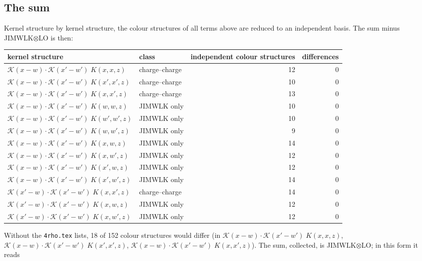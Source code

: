 \documentclass[10pt]{article}
\numberwithin{equation}{section}
\begin{document}
\subsection{The sum}
Kernel structure by kernel structure, the colour structures of all terms above are reduced to an independent basis. The sum minus JIMWLK$\otimes$LO is then:
\begin{table}[H]\centering\small
\begin{tabular}{@{}llrr@{}}\toprule
kernel structure & class & independent colour structures & differences\\\midrule
$\mathcal K(x-w)\cdot\mathcal K(x'-w')\;K(x,x,z)$ & {\color{CC}charge--charge} & 12 & 0\\
$\mathcal K(x-w)\cdot\mathcal K(x'-w')\;K(x',x',z)$ & {\color{CC}charge--charge} & 10 & 0\\
$\mathcal K(x-w)\cdot\mathcal K(x'-w')\;K(x,x',z)$ & {\color{CC}charge--charge} & 13 & 0\\
$\mathcal K(x-w)\cdot\mathcal K(x'-w')\;K(w,w,z)$ & {\color{JIM}JIMWLK only} & 10 & 0\\
$\mathcal K(x-w)\cdot\mathcal K(x'-w')\;K(w',w',z)$ & {\color{JIM}JIMWLK only} & 10 & 0\\
$\mathcal K(x-w)\cdot\mathcal K(x'-w')\;K(w,w',z)$ & {\color{JIM}JIMWLK only} & 9 & 0\\
$\mathcal K(x-w)\cdot\mathcal K(x'-w')\;K(x,w,z)$ & {\color{JIM}JIMWLK only} & 14 & 0\\
$\mathcal K(x-w)\cdot\mathcal K(x'-w')\;K(x,w',z)$ & {\color{JIM}JIMWLK only} & 12 & 0\\
$\mathcal K(x-w)\cdot\mathcal K(x'-w')\;K(x',w,z)$ & {\color{JIM}JIMWLK only} & 12 & 0\\
$\mathcal K(x-w)\cdot\mathcal K(x'-w')\;K(x',w',z)$ & {\color{JIM}JIMWLK only} & 14 & 0\\
$\mathcal K(x'-w)\cdot\mathcal K(x'-w')\;K(x,x',z)$ & {\color{CC}charge--charge} & 14 & 0\\
$\mathcal K(x'-w)\cdot\mathcal K(x'-w')\;K(x,w,z)$ & {\color{JIM}JIMWLK only} & 12 & 0\\
$\mathcal K(x'-w)\cdot\mathcal K(x'-w')\;K(x,w',z)$ & {\color{JIM}JIMWLK only} & 12 & 0\\
\bottomrule
\end{tabular}
\end{table}
\noindent Without the \texttt{4rho.tex} lists, 18 of 152 colour structures would differ (in $\mathcal K(x-w)\cdot\mathcal K(x'-w')\;K(x,x,z)$, $\mathcal K(x-w)\cdot\mathcal K(x'-w')\;K(x',x',z)$, $\mathcal K(x-w)\cdot\mathcal K(x'-w')\;K(x,x',z)$). The sum, collected, is JIMWLK$\otimes$LO; in this form it reads
\end{document}
